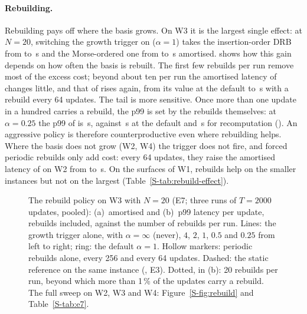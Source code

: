 \paragraph{Rebuilding.}
Rebuilding pays off where the basis grows. On W3 it is the largest single
effect: at $N=20$, switching the growth trigger on ($\alpha=1$) takes the
insertion-order DRB from \NumESevenWThreeNTwentyDrbIdRbAOffPOffAmort{} to
\NumESevenWThreeNTwentyDrbIdRbAOnePOffAmort\,\textmu s and the Morse-ordered one
from \NumESevenWThreeNTwentyMmhmAOffPOffAmort{} to
\NumESevenWThreeNTwentyMmhmAOnePOffAmort\,\textmu s amortised.
 shows how this gain depends on how often the basis is
rebuilt. The first few rebuilds per run remove most of the excess cost; beyond
about ten per run the amortised latency of  changes little,
and that of  rises again, from its value at the default to
\NumESevenWThreeNTwentyMmhmAOffPSixtyFourAmort\,\textmu s with a rebuild every
64 updates. The tail is more sensitive. Once more than one update in a hundred
carries a rebuild, the p99 is set by the rebuilds themselves: at $\alpha=0.25$
the p99 of  is
\NumESevenWThreeNTwentyMmhmAQuarterPOffPNinetyNine\,\textmu s, against
\NumESevenWThreeNTwentyMmhmAOnePOffPNinetyNine\,\textmu s at the default and
\NumWThreeNTwentyFullSortedPNinetyNine\,\textmu s for recomputation
(). An aggressive policy is therefore counterproductive
even where rebuilding helps. Where the basis
does not grow (W2, W4) the trigger does not fire, and forced periodic rebuilds
only add cost: every 64 updates, they raise the amortised latency of
 on W2 from \NumESevenWTwoNTwentyTwoSEightMmhmAOnePOffAmort{} to
\NumESevenWTwoNTwentyTwoSEightMmhmAOnePSixtyFourAmort\,\textmu s. On the
surfaces of W1, rebuilds help on the smaller instances but not on the largest
(Table~\ref{S-tab:rebuild-effect}).

\begin{figure}[t]
  \centering
  \caption{The rebuild policy on W3 with $N=20$ (E7; three runs of
    $T=2000$ updates, pooled): (a)~amortised and (b)~p99 latency per update,
    rebuilds included, against the number of rebuilds per run. Lines: the growth
    trigger alone, with $\alpha=\infty$ (never), $4$, $2$, $1$, $0.5$ and $0.25$
    from left to right; ring: the default $\alpha=1$. Hollow markers: periodic
    rebuilds alone, every 256 and every 64 updates. Dashed: the static
    reference on the same instance (, E3). Dotted, in (b):
    20 rebuilds per run, beyond which more than 1\,\% of the updates carry a
    rebuild. The full sweep on W2, W3 and W4: Figure~\ref{S-fig:rebuild} and
    Table~\ref{S-tab:e7}.}
  \label{fig:rebuild-policy}
\end{figure}

